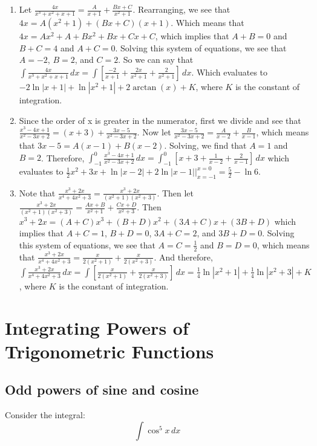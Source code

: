\begin{Answer}[ref=partfrac]
\begin{enumerate}
\item Let $\frac{4x}{x^3 + x^2 + x + 1} = \frac{A}{x + 1} + \frac{Bx + C}{x^2 
+ 1}$. Rearranging, we see that $4x = A(x^2 + 1) + (Bx + C)(x + 1)$. Which 
means that $4x = Ax^2 + A + Bx^2 + Bx + Cx + C$, which implies that $A + B = 
0$ and $B + C = 4$ and $A + C = 0$. Solving this system of equations, we see 
that $A = -2$, $B = 2$, and $C = 2$. So we can say that $\int \frac{4x}{x^3 + 
x^2 + x + 1}\,dx = \int \left[ \frac{-2}{x + 1} + \frac{2x}{x^2 + 1} + \frac{2
}{x^2 + 1} \right]\,dx$. Which evaluates to $-2\ln{|x + 1|} + \ln{|x^2 + 1|} 
+ 2\arctan{(x)} + K$, where $K$ is the constant of integration.  
\item Since the order of x is greater in the numerator, first we divide and 
see that $\frac{x^3 - 4x + 1}{x^2 - 3x + 2} = (x + 3) + \frac{3x - 5}{x^2 - 3x 
+ 2}$. Now let $\frac{3x-5}{x^2 - 3x + 2} = \frac{A}{x-2} + \frac{B}{x - 1}$, 
which means that $3x - 5 = A(x - 1) + B(x - 2)$. Solving, we find that $A = 1$ 
and $B = 2$. Therefore, $\int_{-1}^0 \frac{x^3 - 4x + 1}{x^2 - 3x + 2}\,dx = 
\int_{-1}^0 \left[ x + 3 + \frac{1}{x-2} + \frac{2}{x-1} \right]\,dx$ which 
evaluates to $\frac{1}{2}x^2 + 3x + \ln{|x - 2|} + 2\ln{|x - 1|}|_{x = -1}^{x = 
0} = \frac{5}{2} - \ln{6}$. 
\item Note that $\frac{x^3 + 2x}{x^4 + 4x^2 + 3} = \frac{x^3 + 2x}{(x^2 + 1)(x^
2 + 3)}$. Then let $\frac{x^3 + 2x}{(x^2 + 1)(x^2 + 3)} = \frac{Ax + B}{x^2 + 1
} + \frac{Cx + D}{x^2 + 3}$. Then $x^3 + 2x = (A + C)x^3 + (B + D)x^2 + (3A + C
)x + (3B + D)$ which implies that $A + C = 1$, $B + D = 0$, $3A + C = 2$, and $
3B + D = 0$. Solving this system of equations, we see that $A = C = \frac{1}{2}
$ and $B = D = 0$, which means that $\frac{x^3 + 2x}{x^4 + 4x^2 + 3} = \frac{x
}{2(x^2 + 1)} + \frac{x}{2(x^2 + 3)}$. And therefore, $\int \frac{x^3 + 2x}{x^4 
+ 4x^2 + 3}\,dx = \int \left[ \frac{x}{2(x^2 + 1)} + \frac{x}{2(x^2 + 3)} 
\right]\,dx = \frac{1}{4}\ln{|x^2 + 1|} + \frac{1}{4}\ln{|x^2 + 3|} + K$, 
where $K$ is the constant of integration. 
\end{enumerate}
\end{Answer}

\section{Integrating Powers of Trigonometric Functions}
\subsection{Odd powers of sine and cosine}
Consider the integral:
$$\int \cos^5{x}\,dx$$

